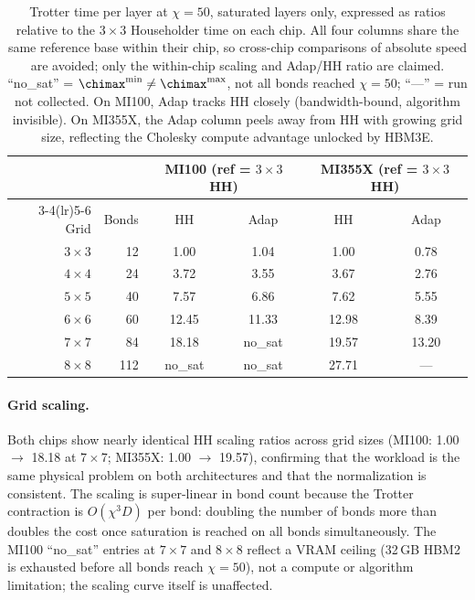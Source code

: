 \begin{table}[ht]
\centering
\caption{Trotter time per layer at $\chi=50$, saturated layers only, expressed as
  ratios relative to the $3\times3$ Householder time on each chip.
  All four columns share the same reference base within their chip, so
  cross-chip comparisons of absolute speed are avoided; only the
  within-chip scaling and Adap/HH ratio are claimed.
  ``no\_sat'' = $\chimax^{\min} \neq \chimax^{\max}$, not all bonds reached $\chi=50$;
  ``---'' = run not collected.
  On MI100, Adap tracks HH closely (bandwidth-bound, algorithm invisible).
  On MI355X, the Adap column peels away from HH with growing grid size,
  reflecting the Cholesky compute advantage unlocked by HBM3E.}
\label{tab:grid_scaling_mi355x}
\smallskip
\small
\begin{tabular}{r r cc cc}
\toprule
& & \multicolumn{2}{c}{MI100 (ref = $3\times3$ HH)} & \multicolumn{2}{c}{MI355X (ref = $3\times3$ HH)} \\
\cmidrule(lr){3-4}\cmidrule(lr){5-6}
Grid & Bonds & HH & Adap & HH & Adap \\
\midrule
$3\times3$ & 12  & 1.00  & 1.04    & 1.00  & 0.78  \\
$4\times4$ & 24  & 3.72  & 3.55    & 3.67  & 2.76  \\
$5\times5$ & 40  & 7.57  & 6.86    & 7.62  & 5.55  \\
$6\times6$ & 60  & 12.45 & 11.33   & 12.98 & 8.39  \\
$7\times7$ & 84  & 18.18 & no\_sat & 19.57 & 13.20 \\
$8\times8$ & 112 & no\_sat & no\_sat & 27.71 & ---  \\
\bottomrule
\end{tabular}
\end{table}

\paragraph{Grid scaling.}
Both chips show nearly identical HH scaling ratios across grid sizes
(MI100: 1.00 $\to$ 18.18 at $7\times7$; MI355X: 1.00 $\to$ 19.57),
confirming that the workload is the same physical problem on both architectures
and that the normalization is consistent.
The scaling is super-linear in bond count because the Trotter contraction is
$O(\chi^3 D)$ per bond: doubling the number of bonds more than doubles the
cost once saturation is reached on all bonds simultaneously.
The MI100 ``no\_sat'' entries at $7\times7$ and $8\times8$ reflect a VRAM
ceiling (32\,GB HBM2 is exhausted before all bonds reach $\chi=50$), not
a compute or algorithm limitation; the scaling curve itself is unaffected.

